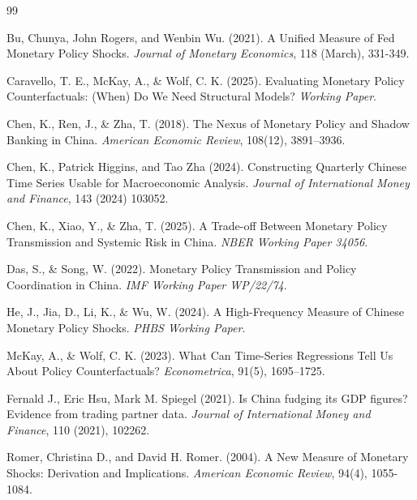 \documentclass[12pt, a4paper]{article}
\begin{document}
\newpage
\begin{thebibliography}{99}

Bu, Chunya, John Rogers, and Wenbin Wu. (2021).
\newblock A Unified Measure of Fed Monetary Policy Shocks.
\newblock \textit{Journal of Monetary Economics}, 118 (March), 331-349. 

Caravello, T. E., McKay, A., \& Wolf, C. K. (2025).
\newblock Evaluating Monetary Policy Counterfactuals: (When) Do We Need Structural Models?
\newblock \textit{Working Paper}.

Chen, K., Ren, J., \& Zha, T. (2018).
\newblock The Nexus of Monetary Policy and Shadow Banking in China.
\newblock \textit{American Economic Review}, 108(12), 3891--3936.

Chen, K., Patrick Higgins, and Tao Zha (2024).
\newblock Constructing Quarterly Chinese Time Series Usable for Macroeconomic Analysis.
\newblock \textit{Journal of International Money and Finance}, 143 (2024) 103052. 

Chen, K., Xiao, Y., \& Zha, T. (2025).
\newblock A Trade-off Between Monetary Policy Transmission and Systemic Risk in China.
\newblock \textit{NBER Working Paper 34056}.


Das, S., \& Song, W. (2022).
\newblock Monetary Policy Transmission and Policy Coordination in China.
\newblock \textit{IMF Working Paper WP/22/74}.

He, J., Jia, D., Li, K., \& Wu, W. (2024).
\newblock A High-Frequency Measure of Chinese Monetary Policy Shocks.
\newblock \textit{PHBS Working Paper}.

McKay, A., \& Wolf, C. K. (2023).
\newblock What Can Time-Series Regressions Tell Us About Policy Counterfactuals?
\newblock \textit{Econometrica}, 91(5), 1695--1725.

Fernald J., Eric Hsu, Mark M. Spiegel (2021).
\newblock Is China fudging its GDP figures? Evidence from trading partner data.
\newblock \textit{Journal of International Money and Finance}, 110 (2021), 102262.

Romer, Christina D., and David H. Romer. (2004).
\newblock A New Measure of Monetary Shocks: Derivation and Implications.
\newblock \textit{American Economic Review}, 94(4), 1055-1084. 


\end{thebibliography}
\end{document}
